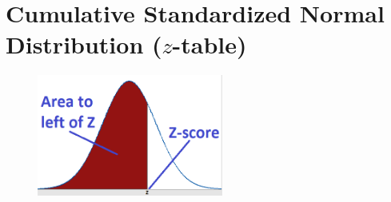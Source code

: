\section{Cumulative Standardized Normal Distribution ($z$-table)}

\changefontsizes{8pt}

\begin{figure}[H]
    \includegraphics[width=\linewidth, height=4cm, keepaspectratio]{Pictures/distributions/z-table_graph.jpg}
\end{figure}

